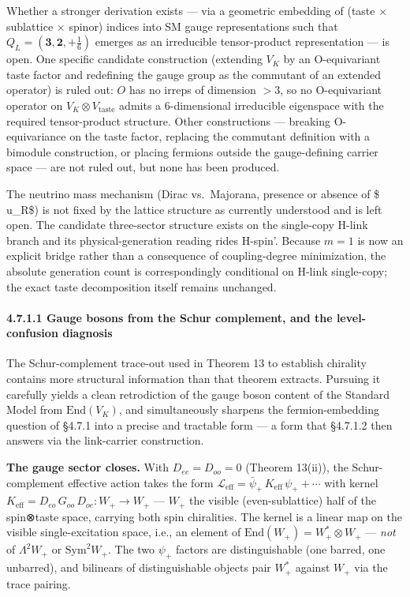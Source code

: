 \documentclass[
]{article}
\begin{document}
Whether a stronger derivation exists --- via a geometric embedding of
(taste × sublattice × spinor) indices into SM gauge representations such
that \(Q_L = (\mathbf{3}, \mathbf{2}, +\tfrac{1}{6})\) emerges as an
irreducible tensor-product representation --- is open. One specific
candidate construction (extending \(V_K\) by an O-equivariant taste
factor and redefining the gauge group as the commutant of an extended
operator) is ruled out: \(O\) has no irreps of dimension \(> 3\), so no
O-equivariant operator on \(V_K \otimes V_\text{taste}\) admits a
6-dimensional irreducible eigenspace with the required tensor-product
structure. Other constructions --- breaking O-equivariance on the taste
factor, replacing the commutant definition with a bimodule construction,
or placing fermions outside the gauge-defining carrier space --- are not
ruled out, but none has been produced.

The neutrino mass mechanism (Dirac vs.~Majorana, presence or absence of
\$ u\_R\$) is not fixed by the lattice structure as currently understood
and is left open. The candidate three-sector structure exists on the
single-copy H-link branch and its physical-generation reading rides
H-spin'. Because \(m=1\) is now an explicit bridge rather than a
consequence of coupling-degree minimization, the absolute generation
count is correspondingly conditional on H-link single-copy; the exact
taste decomposition itself remains unchanged.

\hypertarget{gauge-bosons-from-the-schur-complement-and-the-level-confusion-diagnosis}{%
\paragraph{4.7.1.1 Gauge bosons from the Schur complement, and the
level-confusion
diagnosis}\label{gauge-bosons-from-the-schur-complement-and-the-level-confusion-diagnosis}}

The Schur-complement trace-out used in Theorem 13 to establish chirality
contains more structural information than that theorem extracts.
Pursuing it carefully yields a clean retrodiction of the gauge boson
content of the Standard Model from \(\mathrm{End}(V_K)\), and
simultaneously sharpens the fermion-embedding question of §4.7.1 into a
precise and tractable form --- a form that §4.7.1.2 then answers via the
link-carrier construction.

\textbf{The gauge sector closes.} With \(D_{ee} = D_{oo} = 0\) (Theorem
13(ii)), the Schur-complement effective action takes the form
\(\mathcal{L}_{\text{eff}} = \bar\psi_+\,K_{\text{eff}}\,\psi_+ + \cdots\)
with kernel \(K_{\text{eff}} = D_{eo}\,G_{oo}\,D_{oe}: W_+ \to W_+\) ---
\(W_+\) the visible (even-sublattice) half of the spin⊗taste space,
carrying both spin chiralities. The kernel is a linear map on the
visible single-excitation space, i.e., an element of
\(\mathrm{End}(W_+) = W_+^* \otimes W_+\) --- \emph{not} of
\(\Lambda^2 W_+\) or \(\mathrm{Sym}^2 W_+\). The two \(\psi_+\) factors
are distinguishable (one barred, one unbarred), and bilinears of
distinguishable objects pair \(W_+^*\) against \(W_+\) via the trace
pairing.
\end{document}
